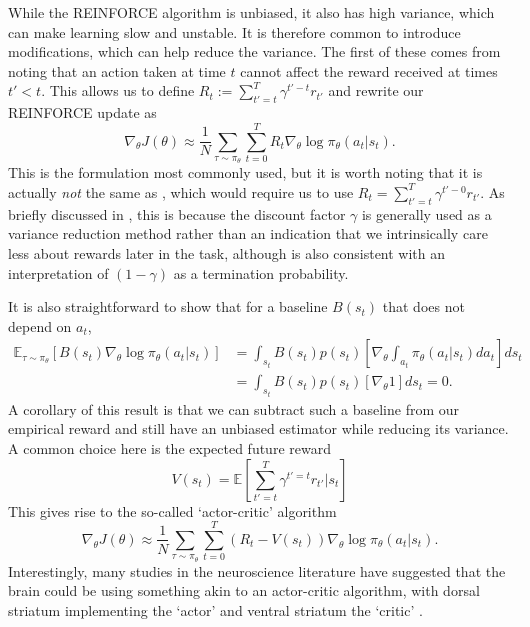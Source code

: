 While the REINFORCE algorithm is unbiased, it also has high variance, which can make learning slow and unstable.
It is therefore common to introduce modifications, which can help reduce the variance.
The first of these comes from noting that an action taken at time $t$ cannot affect the reward received at times $t'<t$.
This allows us to define $R_t := \sum_{t'=t}^T \gamma^{t'-t} r_{t'}$ and rewrite our REINFORCE update as
\begin{equation}
    \label{eq:reinforce}
    \nabla_\theta J(\theta) \approx \frac{1}{N} \sum_{\tau \sim \pi_\theta}  \sum_{t=0}^T R_t \nabla_\theta \log \pi_\theta (a_t|s_t).
\end{equation}
This is the formulation most commonly used, but it is worth noting that it is actually \emph{not} the same as , which would require us to use $R_t= \sum_{t'=t}^T \gamma^{t'-0} r_{t'}$.
As briefly discussed in , this is because the discount factor $\gamma$ is generally used as a variance reduction method rather than an indication that we intrinsically care less about rewards later in the task, although  is also consistent with an interpretation of $(1-\gamma)$ as a termination probability.

It is also straightforward to show that for a baseline $B(s_t)$ that does not depend on $a_t$,
\begin{align}
    \mathbb{E}_{\tau \sim \pi_\theta} \left [ B(s_t) \nabla_\theta \log \pi_\theta (a_t|s_t) \right ]
     & = \int_{s_t} B(s_t) p(s_t) \left [ \nabla_\theta \int_{a_t} \pi_\theta (a_t|s_t) da_t \right ] ds_t \\
     & = \int_{s_t} B(s_t) p(s_t) \left [ \nabla_\theta 1 \right ] ds_t = 0.
\end{align}
A corollary of this result is that we can subtract such a baseline from our empirical reward and still have an unbiased estimator while reducing its variance.
A common choice here is the expected future reward
\begin{equation}
    V(s_t) = \mathbb{E} \left [ \sum_{t' = t}^T \gamma^{t'=t} r_{t'} | s_t \right ]
\end{equation}
This gives rise to the so-called `actor-critic' algorithm
\begin{equation}
    \nabla_\theta J(\theta) \approx \frac{1}{N} \sum_{\tau \sim \pi_\theta}  \sum_{t=0}^T (R_t - V(s_t)) \nabla_\theta \log \pi_\theta (a_t|s_t).
\end{equation}
Interestingly, many studies in the neuroscience literature have suggested that the brain could be using something akin to an actor-critic algorithm, with dorsal striatum implementing the `actor' and ventral striatum the `critic' \citep{takahashi2008silencing,sutton2018reinforcement}.


